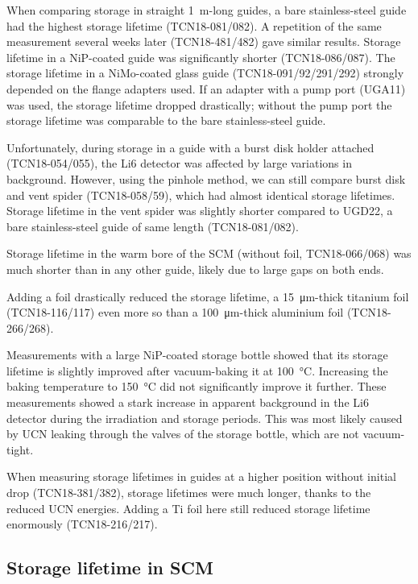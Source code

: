 \documentclass[10pt,letterpaper]{article}
\begin{document}
When comparing storage in straight \SI{1}{\meter}-long guides, a bare stainless-steel guide had the highest storage lifetime (TCN18-081/082). A repetition of the same measurement several weeks later (TCN18-481/482) gave similar results. Storage lifetime in a NiP-coated guide was significantly shorter (TCN18-086/087). The storage lifetime in a NiMo-coated glass guide (TCN18-091/92/291/292) strongly depended on the flange adapters used. If an adapter with a pump port (UGA11) was used, the storage lifetime dropped drastically; without the pump port the storage lifetime was comparable to the bare stainless-steel guide.

Unfortunately, during storage in a guide with a burst disk holder attached (TCN18-054/055), the Li6 detector was affected by large variations in background. However, using the pinhole method, we can still compare burst disk and vent spider (TCN18-058/59), which had almost identical storage lifetimes. Storage lifetime in the vent spider was slightly shorter compared to UGD22, a bare stainless-steel guide of same length (TCN18-081/082).

Storage lifetime in the warm bore of the SCM (without foil, TCN18-066/068) was much shorter than in any other guide, likely due to large gaps on both ends.

Adding a foil drastically reduced the storage lifetime, a \SI{15}{\micro\meter}-thick titanium foil (TCN18-116/117) even more so than a \SI{100}{\micro\meter}-thick aluminium foil (TCN18-266/268).

Measurements with a large NiP-coated storage bottle showed that its storage lifetime is slightly improved after vacuum-baking it at \SI{100}{\celsius}. Increasing the baking temperature to \SI{150}{\celsius} did not significantly improve it further. These measurements showed a stark increase in apparent background in the Li6 detector during the irradiation and storage periods. This was most likely caused by UCN leaking through the valves of the storage bottle, which are not vacuum-tight.

When measuring storage lifetimes in guides at a higher position without initial drop (TCN18-381/382), storage lifetimes were much longer, thanks to the reduced UCN energies. Adding a Ti foil here still reduced storage lifetime enormously (TCN18-216/217).


\subsection{Storage lifetime in SCM}
\end{document}
